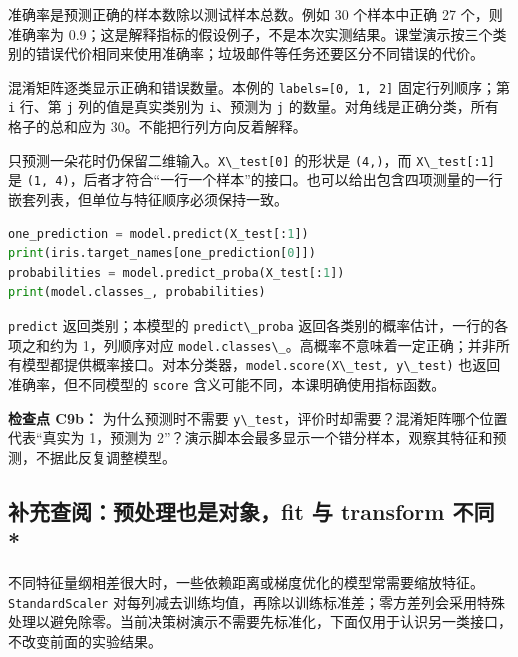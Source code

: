 \documentclass[UTF8,a4paper,11pt,fontset=fandol]{ctexart}
\providecommand{\passthrough}[1]{#1}
\begin{document}
准确率是预测正确的样本数除以测试样本总数。例如 30 个样本中正确 27 个，则准确率为 0.9；这是解释指标的假设例子，不是本次实测结果。课堂演示按三个类别的错误代价相同来使用准确率；垃圾邮件等任务还要区分不同错误的代价。

混淆矩阵逐类显示正确和错误数量。本例的 \passthrough{\lstinline!labels=[0, 1, 2]!} 固定行列顺序；第 \passthrough{\lstinline!i!} 行、第 \passthrough{\lstinline!j!} 列的值是真实类别为 \passthrough{\lstinline!i!}、预测为 \passthrough{\lstinline!j!} 的数量。对角线是正确分类，所有格子的总和应为 30。不能把行列方向反着解释。

只预测一朵花时仍保留二维输入。\passthrough{\lstinline!X\_test[0]!} 的形状是 \passthrough{\lstinline!(4,)!}，而 \passthrough{\lstinline!X\_test[:1]!} 是 \passthrough{\lstinline!(1, 4)!}，后者才符合``一行一个样本''的接口。也可以给出包含四项测量的一行嵌套列表，但单位与特征顺序必须保持一致。

\begin{lstlisting}[language=Python]
one_prediction = model.predict(X_test[:1])
print(iris.target_names[one_prediction[0]])
probabilities = model.predict_proba(X_test[:1])
print(model.classes_, probabilities)
\end{lstlisting}

\passthrough{\lstinline!predict!} 返回类别；本模型的 \passthrough{\lstinline!predict\_proba!} 返回各类别的概率估计，一行的各项之和约为 1，列顺序对应 \passthrough{\lstinline!model.classes\_!}。高概率不意味着一定正确；并非所有模型都提供概率接口。对本分类器，\passthrough{\lstinline!model.score(X\_test, y\_test)!} 也返回准确率，但不同模型的 \passthrough{\lstinline!score!} 含义可能不同，本课明确使用指标函数。

\textbf{检查点 C9b：} 为什么预测时不需要 \passthrough{\lstinline!y\_test!}，评价时却需要？混淆矩阵哪个位置代表``真实为 1，预测为 2''？演示脚本会最多显示一个错分样本，观察其特征和预测，不据此反复调整模型。

\clearpage

\subsection{补充查阅：预处理也是对象，fit 与 transform 不同 *}\label{ux8865ux5145ux67e5ux9605ux9884ux5904ux7406ux4e5fux662fux5bf9ux8c61fit-ux4e0e-transform-ux4e0dux540c}

不同特征量纲相差很大时，一些依赖距离或梯度优化的模型常需要缩放特征。\passthrough{\lstinline!StandardScaler!} 对每列减去训练均值，再除以训练标准差；零方差列会采用特殊处理以避免除零。当前决策树演示不需要先标准化，下面仅用于认识另一类接口，不改变前面的实验结果。
\end{document}
